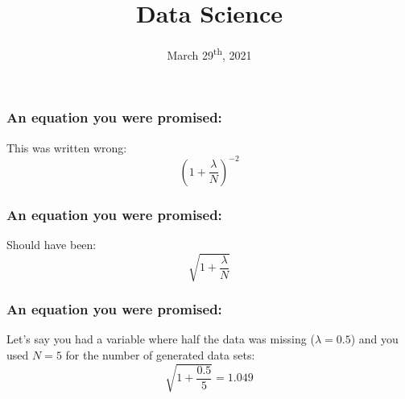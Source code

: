 \documentclass{beamer}
\title{Data Science}%
\subtitle{\blueit{Midterm Review}}
\date{March 29\textsuperscript{th}, 2021}
\begin{document}
	\frame {
		\titlepage
	}






  \begin{frame}
    \frametitle{An equation you were promised:}
    This was written wrong:
    \begin{equation*}
      (1 + \frac{\lambda}{N})^{-2}
    \end{equation*}
  \end{frame}

  \begin{frame}
    \frametitle{An equation you were promised:}
    Should have been:
    \begin{equation*}
      \sqrt{1 + \frac{\lambda}{N}}
    \end{equation*}
  \end{frame}

  \begin{frame}
    \frametitle{An equation you were promised:}
    Let's say you had a variable where half the data was missing
    ($\lambda = 0.5$) and you used $N = 5$ for the number of generated data
    sets:
    \begin{equation*}
      \sqrt{1 + \frac{0.5}{5}} = 1.049
    \end{equation*}
  \end{frame}
\end{document}
